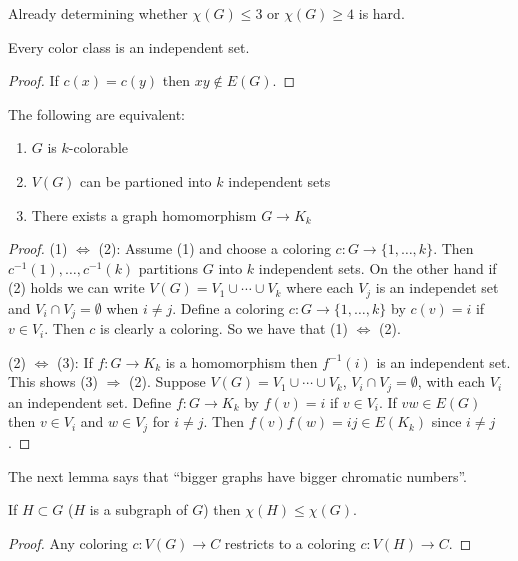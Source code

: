 \begin{remark}
Already determining whether $\chi(G)\leqslant 3$ or $\chi(G)\geqslant 4$ is hard.
\end{remark}

\begin{observation}
Every color class is an independent set.
\end{observation}
\begin{proof}
If $c(x) = c(y)$ then $xy \notin E(G)$.
\end{proof}

\begin{lemma}
The following are equivalent:
\begin{enumerate}[(1)]
\item $G$ is $k$-colorable
\item $V(G)$ can be partioned into $k$ independent sets
\item There exists a graph homomorphism $G \rightarrow K_k$
\end{enumerate}
\end{lemma}
\begin{proof}
(1) $\Leftrightarrow$ (2): Assume (1) and choose a coloring $c \colon G
\rightarrow \{1,\ldots,k\}$. Then $c^{-1}(1),\ldots,c^{-1}(k)$
partitions $G$ into $k$ independent sets. On the other hand if (2) holds
we can write $V(G) = V_1 \cup \cdots \cup V_k$ where each $V_j$ is an
independet set and $V_i \cap V_j = \emptyset$ when $i \neq j$. Define a
coloring $c \colon G \rightarrow \{1,\ldots,k\}$ by $c(v) = i$ if $v \in
V_i$. Then $c$ is clearly a coloring. So we have that (1)
$\Leftrightarrow$ (2).

(2) $\Leftrightarrow$ (3): If $f \colon G \rightarrow K_k$ is a
homomorphism then $f^{-1}(i)$ is an independent set. This shows (3)
$\Rightarrow$ (2). Suppose $V(G) = V_1 \cup \cdots \cup V_k$, $V_i \cap
V_j = \emptyset$, with each $V_i$ an independent set. Define $f \colon G
\rightarrow K_k$ by $f(v) = i$ if $v \in V_i$. If $vw \in E(G)$ then $v
\in V_i$ and $w \in V_j$ for $i \neq j$. Then $f(v)f(w) = ij \in E(K_k)$
since $i \neq j$.
\end{proof}

The next lemma says that ``bigger graphs have bigger chromatic
numbers''.
\begin{lemma}
If $H \subset G$ ($H$ is a subgraph of $G$) then $\chi(H) \le \chi(G)$.
\end{lemma}
\begin{proof}
Any coloring $c \colon V(G) \rightarrow C$ restricts to a coloring $c
\colon V(H) \rightarrow C$.
\end{proof}


